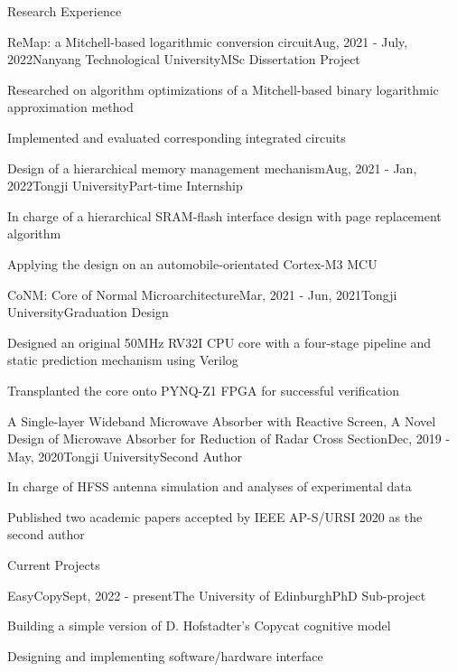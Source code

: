 \documentclass{resume} %
\begin{document}
\begin{rSection}{Research Experience}
	
	\begin{rSubsection}{ReMap: a Mitchell-based logarithmic conversion circuit}{Aug, 2021 - July, 2022}{Nanyang Technological University}{MSc Dissertation Project}
		\item Researched on algorithm optimizations of a Mitchell-based binary logarithmic approximation method
		\item Implemented and evaluated corresponding integrated circuits
	\end{rSubsection}

	\begin{rSubsection}{Design of a hierarchical memory management mechanism}{Aug, 2021 - Jan, 2022}{Tongji University}{Part-time Internship}
		\item In charge of a hierarchical SRAM-flash interface design with page replacement algorithm
		\item Applying the design on an automobile-orientated Cortex-M3 MCU
	\end{rSubsection}
	
	\begin{rSubsection}{CoNM: Core of Normal Microarchitecture}{Mar, 2021 - Jun, 2021}{Tongji University}{Graduation Design}
		\item Designed an original 50MHz RV32I CPU core with a four-stage pipeline and static prediction mechanism using Verilog
		\item Transplanted the core onto PYNQ-Z1 FPGA for successful verification
	\end{rSubsection}

	\begin{rSubsection}{A Single-layer Wideband Microwave Absorber with Reactive Screen, A Novel Design of Microwave Absorber for Reduction of Radar Cross Section}{Dec, 2019 - May, 2020}{Tongji University}{Second Author}
		\item In charge of HFSS antenna simulation and analyses of experimental data
		\item Published two academic papers accepted by IEEE AP-S/URSI 2020 as the second author
	\end{rSubsection}

\end{rSection}

\newpage

\begin{rSection}{Current Projects}
	
	\begin{rSubsection}{EasyCopy}{Sept, 2022 - present}{The University of Edinburgh}{PhD Sub-project}
		\item Building a simple version of D. Hofstadter's Copycat cognitive model
		\item Designing and implementing software/hardware interface
	\end{rSubsection}

\end{rSection}
\end{document}
